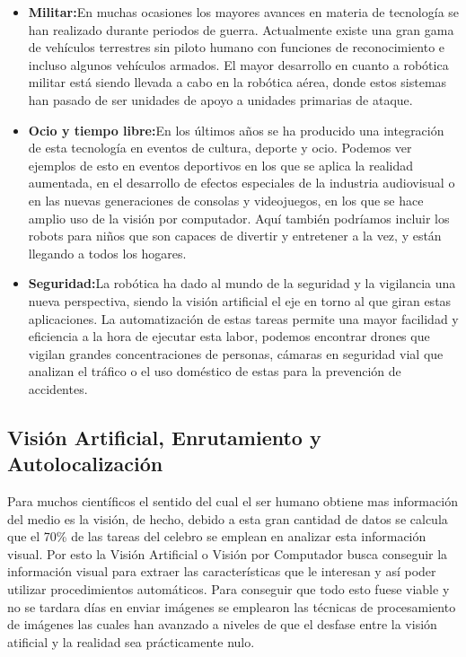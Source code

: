 \begin{itemize}
		\item \textbf{Militar:}En muchas ocasiones los mayores avances en materia de tecnología se han realizado durante periodos de guerra. Actualmente existe una gran gama de vehículos terrestres sin piloto humano con funciones de reconocimiento e incluso algunos vehículos armados. El mayor desarrollo en cuanto a robótica militar está siendo llevada a cabo en la robótica aérea, donde estos sistemas han pasado de ser unidades de apoyo a unidades primarias de ataque.
		\item \textbf{Ocio y tiempo libre:}En los últimos años se ha producido una integración de esta tecnología en eventos de cultura, deporte y ocio. Podemos ver ejemplos de esto en eventos deportivos en los que se aplica la realidad aumentada, en el desarrollo de efectos especiales de la industria audiovisual o en las nuevas generaciones de consolas y videojuegos, en los que se hace amplio uso de la visión por computador. Aquí también podríamos incluir los robots para niños que son capaces de divertir y entretener a la vez, y están llegando a todos los hogares.
		\item \textbf{Seguridad:}La robótica ha dado al mundo de la seguridad y la vigilancia una nueva perspectiva, siendo la visión artificial el eje en torno al que giran estas aplicaciones. La automatización de estas tareas permite una mayor facilidad y eficiencia a la hora de ejecutar esta labor, podemos encontrar drones que vigilan grandes concentraciones de personas, cámaras en seguridad vial que analizan el tráfico o el uso doméstico de estas para la prevención de accidentes.
\end{itemize}

\subsection{Visión Artificial, Enrutamiento y Autolocalización}
\hspace{1cm} Para muchos científicos el sentido del cual el ser humano obtiene mas información del medio es la visión, de hecho, debido a esta gran cantidad de datos se calcula que el 70\% de las tareas del celebro se emplean en analizar esta información visual. Por esto la Visión Artificial o Visión por Computador busca conseguir la información visual para extraer las características que le interesan y así poder utilizar procedimientos automáticos. Para conseguir que todo esto fuese viable y no se tardara días en enviar imágenes se emplearon las técnicas de procesamiento de imágenes las cuales han avanzado a niveles de que el desfase entre la visión atificial y la realidad sea prácticamente nulo.

